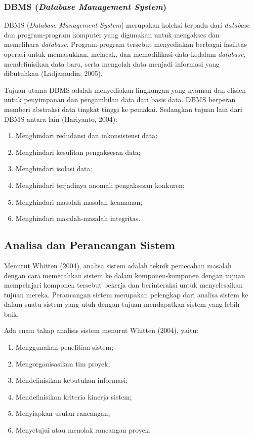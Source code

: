     \subsubsection{DBMS (\emph{Database Management System})}
    DBMS (\emph{Database Management System}) merupakan koleksi terpadu dari \emph{database} dan program-program komputer yang digunakan untuk mengakses dan memelihara \emph{database}. Program-program tersebut menyediakan berbagai fasilitas operasi untuk memasukkan, melacak, dan memodifikasi data kedalam \emph{database}, mendefinisikan data baru, serta mengolah data menjadi informasi yang dibutuhkan (Ladjamudin, 2005).

    Tujuan utama DBMS adalah menyediakan lingkungan yang nyaman dan efisien untuk penyimpanan dan pengambilan data dari basis data. DBMS berperan memberi abstraksi data tingkat tinggi ke pemakai. Sedangkan tujuan lain dari DBMS antara lain (Hariyanto, 2004):
    \begin{enumerate}
      \itemsep0em
      \item Menghindari redudansi dan inkonsistensi data;
      \item Menghindari kesulitan pengaksesan data;
      \item Menghindari isolasi data;
      \item Menghindari terjadinya anomali pengaksesan konkuren;
      \item Menghindari masalah-masalah keamanan;
      \item Menghindari masalah-masalah integritas.
    \end{enumerate}
    
\subsection{Analisa dan Perancangan Sistem}
    Menurut Whitten (2004), analisa sistem adalah teknik pemecahan masalah dengan cara memecahkan sistem ke dalam komponen-komponen dengan tujuan mempelajari komponen tersebut bekerja dan berinteraksi untuk menyelesaikan tujuan mereka. Perancangan sistem merupakan pelengkap dari analisa sistem ke dalam suatu sistem yang utuh dengan tujuan mendapatkan sistem yang lebih baik.

    Ada enam tahap analisis sistem menurut Whitten (2004), yaitu:
    \begin{enumerate}
      \itemsep0em
      \item Menggunakan penelitian sistem;
      \item Mengorganisasikan tim proyek;
      \item Mendefinisikan kebutuhan informasi;
      \item Mendefinisikan kriteria kinerja sistem;
      \item Menyiapkan usulan rancangan;
      \item Menyetujui atau menolak rancangan proyek.
    \end{enumerate}

